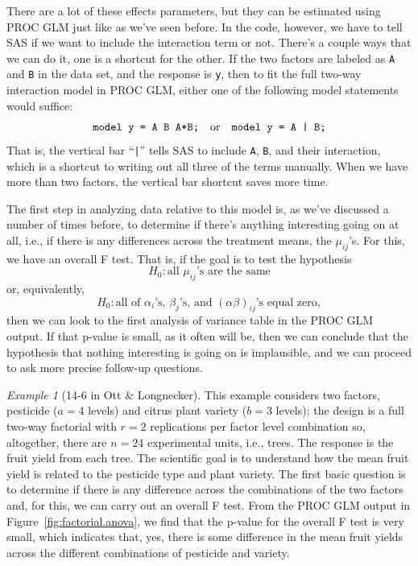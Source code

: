 \documentclass[a4paper, 12pt]{article}
\theoremstyle{plain}
\theoremstyle{definition}
\theoremstyle{remark}
\newtheorem*{example}{Example}
\begin{document}
There are a lot of these effects parameters, but they can be estimated using PROC GLM just like as we've seen before.  In the code, however, we have to tell SAS if we want to include the interaction term or not.  There's a couple ways that we can do it, one is a shortcut for the other.  If the two factors are labeled as {\tt A} and {\tt B} in the data set, and the response is {\tt y}, then to fit the full two-way interaction model in PROC GLM, either one of the following model statements would suffice:
\[ \text{\tt model y = A B A*B;} \quad \text{or} \quad \text{\tt model y = A | B;} \]
That is, the vertical bar ``{\tt |}'' tells SAS to include {\tt A}, {\tt B}, and their interaction, which is a shortcut to writing out all three of the terms manually.  When we have more than two factors, the vertical bar shortcut saves more time.  

The first step in analyzing data relative to this model is, as we've discussed a number of times before, to determine if there's anything interesting going on at all, i.e., if there is any differences across the treatment means, the $\mu_{ij}$'s.  For this, we have an overall F test.  That is, if the goal is to test the hypothesis 
\[ H_0: \text{all $\mu_{ij}$'s are the same} \]
or, equivalently, 
\[ H_0: \text{all of $\alpha_i$'s, $\beta_j$'s, and $(\alpha\beta)_{ij}$'s equal zero}, \]
then we can look to the first analysis of variance table in the PROC GLM output.  If that p-value is small, as it often will be, then we can conclude that the hypothesis that nothing interesting is going on is implausible, and we can proceed to ask more precise follow-up questions.  

\begin{example}[14-6 in Ott \& Longnecker]
This example considers two factors, pesticide ($a=4$ levels) and citrus plant variety ($b=3$ levels); the design is a full two-way factorial with $r=2$ replications per factor level combination so, altogether, there are $n=24$ experimental units, i.e., trees.  The response is the fruit yield from each tree.  The scientific goal is to understand how the mean fruit yield is related to the pesticide type and plant variety.  The first basic question is to determine if there is any difference across the combinations of the two factors and, for this, we can carry out an overall F test.  From the PROC GLM output in Figure~\ref{fig:factorial.anova}, we find that the p-value for the overall F test is very small, which indicates that, yes, there is some difference in the mean fruit yields across the different combinations of pesticide and variety.  
\end{example}
\end{document}
